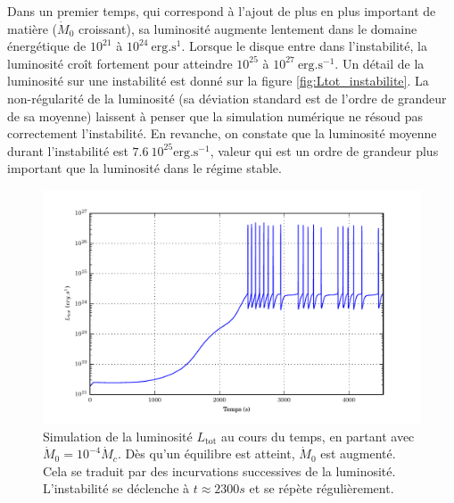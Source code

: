 Dans un premier temps, qui correspond à l'ajout de plus en plus important de matière ($\dot{M}_0$ croissant), sa luminosité augmente lentement dans le domaine énergétique de $10^{21}$ à $10^{24}\ \mathrm{erg.s^{1}}$. Lorsque le disque entre dans l'instabilité, la luminosité croît fortement pour atteindre $10^{25}$ à $10^{27}\ \mathrm{erg.s^{-1}}$. Un détail de la luminosité sur une instabilité est donné sur la figure \ref{fig:Ltot_instabilite}. La non-régularité de la luminosité (sa déviation standard est de l'ordre de grandeur de sa moyenne) laissent à penser que la simulation numérique ne résoud pas correctement l'instabilité. En revanche, on constate que la luminosité moyenne durant l'instabilité est $7.6\ 10^{25}\mathrm{erg.s^{-1}}$, valeur qui est un ordre de grandeur plus important que la luminosité dans le régime stable.
\begin{figure}
  \includegraphics{figures/Ltot_fonction_t.pdf}
  \caption{Simulation de la luminosité $L_\mathrm{tot}$ au cours du temps, en partant avec $\dot{M}_0 = 10^{-4}\dot{M}_c$. Dès qu'un équilibre est atteint, $\dot{M}_0$ est augmenté. Cela se traduit par des incurvations successives de la luminosité. L'instabilité se déclenche à $t \approx 2300s$ et se répète régulièrement.}
  \label{fig:Ltot_function_t}
\end{figure}

